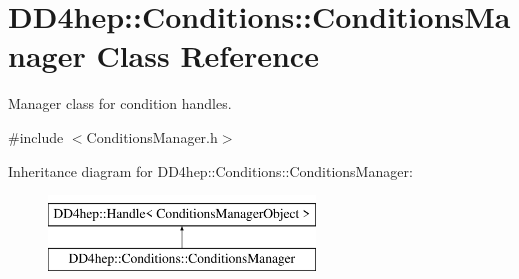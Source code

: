 \hypertarget{class_d_d4hep_1_1_conditions_1_1_conditions_manager}{}\section{D\+D4hep\+:\+:Conditions\+:\+:Conditions\+Manager Class Reference}
\label{class_d_d4hep_1_1_conditions_1_1_conditions_manager}


Manager class for condition handles.  




{\ttfamily \#include $<$Conditions\+Manager.\+h$>$}

Inheritance diagram for D\+D4hep\+:\+:Conditions\+:\+:Conditions\+Manager\+:\begin{figure}[H]
\begin{center}
\leavevmode
\includegraphics[height=2.000000cm]{class_d_d4hep_1_1_conditions_1_1_conditions_manager}
\end{center}
\end{figure}

